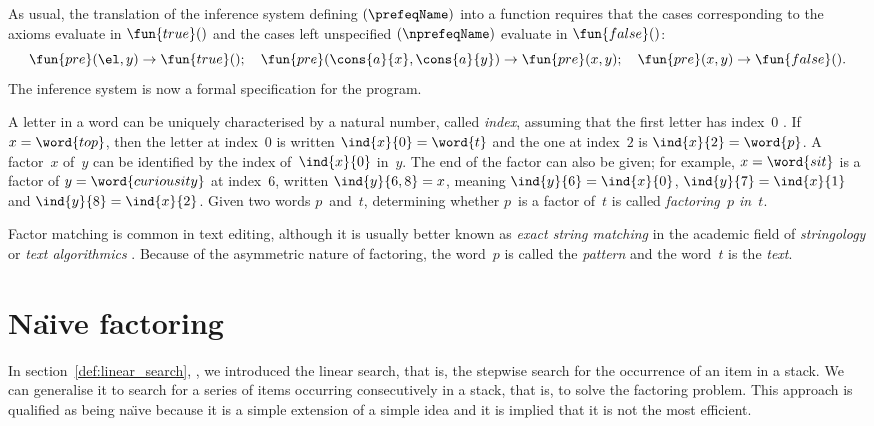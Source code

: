 
As usual, the translation of the inference system defining
\((\prefeqName)\) into a function 
requires that the cases corresponding to the axioms evaluate in
\(\fun{true}()\) and the cases left unspecified \((\nprefeqName)\)
evaluate in \(\fun{false}()\):
\begin{equation*}
\fun{pre}(\el,y) \rightarrow \fun{true}();\quad
\fun{pre}(\cons{a}{x},\cons{a}{y}) \rightarrow \fun{pre}(x,y);\quad
\fun{pre}(x,y) \rightarrow \fun{false}().
\end{equation*}
The inference system is now a formal specification for the program.

A letter in a word can be uniquely characterised by a natural number,
called \emph{index}, assuming that the
first letter has index~\(0\) \citep{Dijkstra_1982}. If
\(x=\word{top}\), then the letter at index~\(0\) is written
\(\ind{x}{0}=\word{t}\) and the one at index~\(2\) is
\(\ind{x}{2}=\word{p}\). A factor~\(x\) of~\(y\) can be identified by
the index of~\(\ind{x}{0}\) in~\(y\). The end of the factor can also
be given; for example, \(x=\word{sit}\) is a factor of
\(y=\word{curiousity}\) at index~\(6\), written \(\ind{y}{6,8} = x\),
meaning \(\ind{y}{6} = \ind{x}{0}\), \(\ind{y}{7} = \ind{x}{1}\) and
\(\ind{y}{8} = \ind{x}{2}\). Given two words \(p\)~and~\(t\),
determining whether \(p\)~is a factor of~\(t\) is called
\emph{factoring~\(p\) in~\(t\)}.

Factor matching is common in text editing, although it is usually
better known as \emph{exact string matching} in the academic field of
\emph{stringology} or \emph{text
  algorithmics} \citep{CharrasLecroq_2004,CrochemoreHancartLecroq_2007}
\citep[\S{}32]{CLRS_2009}. Because of the asymmetric nature of
factoring, the word~\(p\) is called the \emph{pattern} and the word~\(t\) is the \emph{text}.

\section{Na\"{\i}ve factoring}
\label{sec:naive_factoring}

In section~\ref{def:linear_search}, , we
introduced the linear search, that is, the
stepwise search for the occurrence of an item in a stack. We can
generalise it to search for a series of items occurring consecutively
in a stack, that is, to solve the factoring problem. This approach is
qualified as being na\"{\i}ve because it is a simple extension of a
simple idea and it is implied that it is not the most efficient.

